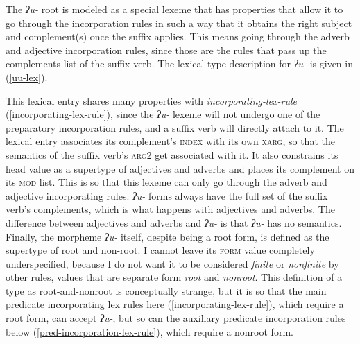 The \textit{ʔu-} root is modeled as a special lexeme that has properties that allow it to go through the incorporation rules in such a way that it obtains the right subject and complement(s) once the suffix applies. This means going through the adverb and adjective incorporation rules, since those are the rules that pass up the complements list of the suffix verb. The lexical type description for \textit{ʔu-} is given in (\ref{uu-lex}).

\begin{singlespacing}
\ex \label{uu-lex}
\xe
\end{singlespacing}

This lexical entry shares many properties with \textit{incorporating-lex-rule} (\ref{incorporating-lex-rule}), since the \textit{ʔu-} lexeme will not undergo one of the preparatory incorporation rules, and a suffix verb will directly attach to it. The lexical entry associates its complement's \textsc{index} with its own \textsc{xarg}, so that the semantics of the suffix verb's \textsc{arg2} get associated with it. It also constrains its head value as a supertype of adjectives and adverbs and places its complement on its \textsc{mod} list. This is so that this lexeme can only go through the adverb and adjective incorporating rules. \textit{ʔu-} forms always have the full set of the suffix verb's complements, which is what happens with adjectives and adverbs. The difference between adjectives and adverbs and \textit{ʔu-} is that \textit{ʔu-} has no semantics. Finally, the morpheme \textit{ʔu-} itself, despite being a root form, is defined as the supertype of root and non-root. I cannot leave its \textsc{form} value completely underspecified, because I do not want it to be considered \textit{finite} or \textit{nonfinite} by other rules, values that are separate form \textit{root} and \textit{nonroot}. This definition of a type as root-and-nonroot is conceptually strange, but it is so that the main predicate incorporating lex rules here (\ref{incorporating-lex-rule}), which require a root form, can accept \textit{ʔu-}, but so can the auxiliary predicate incorporation rules below (\ref{pred-incorporation-lex-rule}), which require a nonroot form.



